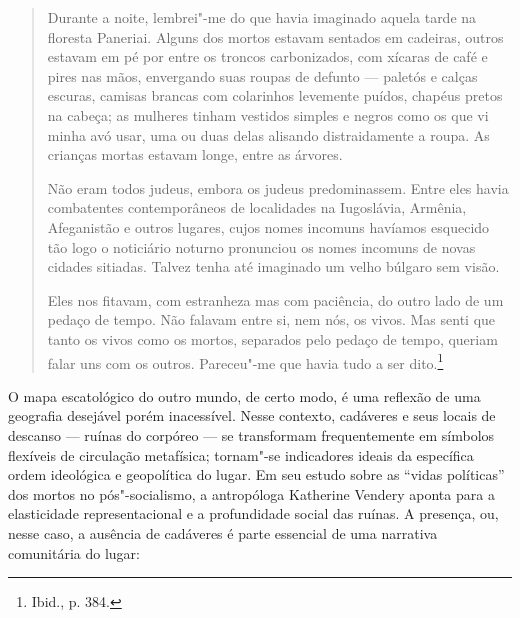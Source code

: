 \begin{quote}
Durante a noite, lembrei"-me do que havia imaginado aquela tarde na
floresta Paneriai. Alguns dos mortos estavam sentados em cadeiras,
outros estavam em pé por entre os troncos carbonizados, com xícaras de
café e pires nas mãos, envergando suas roupas de defunto --- paletós e
calças escuras, camisas brancas com colarinhos levemente puídos, chapéus
pretos na cabeça; as mulheres tinham vestidos simples e negros como os
que vi minha avó usar, uma ou duas delas alisando distraidamente a
roupa. As crianças mortas estavam longe, entre as árvores.

Não eram todos judeus, embora os judeus predominassem. Entre eles havia
combatentes contemporâneos de localidades na Iugoslávia, Armênia,
Afeganistão e outros lugares, cujos nomes incomuns havíamos esquecido
tão logo o noticiário noturno pronunciou os nomes incomuns de novas
cidades sitiadas. Talvez tenha até imaginado um velho búlgaro sem visão.

Eles nos fitavam, com estranheza mas com paciência, do outro lado de um
pedaço de tempo. Não falavam entre si, nem nós, os vivos. Mas senti que
tanto os vivos como os mortos, separados pelo pedaço de tempo, queriam
falar uns com os outros. Pareceu"-me que havia tudo a ser dito.\footnote{Ibid., p. 384.} 
\end{quote}

O mapa escatológico do outro mundo, de certo modo, é uma reflexão de uma
geografia desejável porém inacessível. Nesse contexto, cadáveres e seus
locais de descanso --- ruínas do corpóreo --- se transformam frequentemente
em símbolos flexíveis de circulação metafísica; tornam"-se indicadores
ideais da específica ordem ideológica e geopolítica do lugar. Em seu
estudo sobre as ``vidas políticas'' dos mortos no pós"-socialismo, a
antropóloga Katherine Vendery aponta para a elasticidade
representacional e a profundidade social das ruínas. A presença, ou,
nesse caso, a ausência de cadáveres é parte essencial de uma narrativa
comunitária do lugar:

